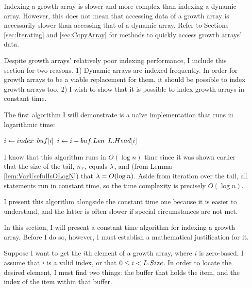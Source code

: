 \HdrGrowthArrayImpl

Indexing a growth array is slower and more complex than indexing a dynamic array. However, this does not mean that accessing data of a growth array is necessarily slower than accessing that of a dynamic array. Refer to Sections \ref{sec:Iterating} and \ref{sec:CopyArray} for methods to quickly access growth arrays' data.

Despite growth arrays' relatively poor indexing performance, I include this section for two reasons. 1) Dynamic arrays are indexed frequently. In order for growth arrays to be a viable replacement for them, it should be possible to index growth arrays too. 2) I wish to show that it is possible to index growth arrays in constant time.

\HdrLogarithmicImpl

The first algorithm I will demonstrate is a na\"{i}ve implementation that runs in logarithmic time:

\begin{algorithm}[H]
	\begin{algorithmic}
		\Function{$\FuncGetItem$}{$\VarList,\ \ParamIndex$}
			\State $i \gets index$
					\State \Return $buf[i]$
				\EndIf
				\State $i \gets i - buf.Len$
			\EndFor
			\State \Return $L.Head[i]$
		\EndFunction
	\end{algorithmic}
\end{algorithm}

I know that this algorithm runs in $O(\log n)$ time since it was shown earlier that the size of the tail, $n_\tau$, equals $\lambda$, and (from Lemma \ref{lem:VarUsefulIsOLogN}) that $\lambda = O(\log n)$. Aside from iteration over the tail, all statements run in constant time, so the time complexity is precisely $O(\log n)$.

I present this algorithm alongside the constant time one because it is easier to understand, and the latter is often slower if special circumstances are not met.

\HdrConstantImpl

In this section, I will present a constant time algorithm for indexing a growth array. Before I do so, however, I must establish a mathematical justification for it.

Suppose I want to get the $i$th element of a growth array, where $i$ is zero-based. I assume that $i$ is a valid index, or that $0 \leq i < L.Size$. In order to locate the desired element, I must find two things: the buffer that holds the item, and the index of the item within that buffer.

